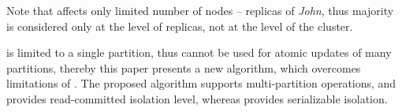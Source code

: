 Note that \lwt affects only limited number of nodes -- replicas of \emph{John}, thus majority is considered only at the level of replicas, not at the level of the cluster.

\lwt is limited to a single partition, thus \lwt cannot be used for atomic updates of many partitions, thereby this paper presents a new algorithm, which overcomes limitations of \lwt.
The proposed algorithm supports multi-partition operations, and provides read-committed isolation level, whereas \lwt provides serializable isolation.



